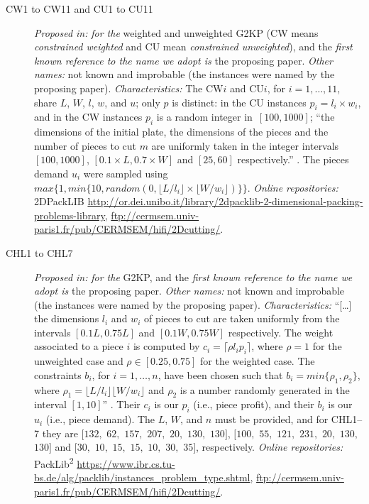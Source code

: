 \documentclass[ppgc,tese,english,formais,babel]{iiufrgs}
\begin{document}
\begin{description}
\item [CW1 to CW11 and CU1 to CU11] \emph{Proposed in:} \citet{fayard:1998} \emph{for the} weighted and unweighted G2KP (CW means \emph{constrained weighted} and CU mean \emph{constrained unweighted}), and the \emph{first known reference to the name we adopt is} the proposing paper. \emph{Other names:} not known and improbable (the instances were named by the proposing paper). \emph{Characteristics: } The CW\(i\) and CU\(i\), for \(i = 1, \dots, 11\), share \(L\), \(W\), \(l\), \(w\), and \(u\); only \(p\) is distinct: in the CU instances \(p_i = l_i \times w_i\), and in the CW instances \(p_i\) is a random integer in~\([100, 1000]\); ``the dimensions of the initial plate, the dimensions of the pieces and the number of pieces to cut \(m\) are uniformly taken in the integer intervals \([100, 1000]\), \([0.1 \times L, 0.7 \times W]\) and \([25, 60]\) respectively.'' \citep{fayard:1998}. The pieces demand \(u_i\) were sampled using~\(max\{1, min\{10, random(0, \lfloor L/l_i \rfloor \times \lfloor W/w_i \rfloor)\}\}\). \emph{Online repositories:} 2DPackLIB \url{http://or.dei.unibo.it/library/2dpacklib-2-dimensional-packing-problems-library}, \url{ftp://cermsem.univ-paris1.fr/pub/CERMSEM/hifi/2Dcutting/}.
\item [CHL1 to CHL7] \emph{Proposed in:} \citet{cung:2000} \emph{for the} G2KP, and the \emph{first known reference to the name we adopt is} the proposing paper. \emph{Other names: } not known and improbable (the instances were named by the proposing paper). \emph{Characteristics: } ``[\dots] the dimensions \(l_i\) and \(w_i\) of pieces to cut are taken uniformly from the intervals \([0.1L, 0.75L]\) and \([0.1W, 0.75W]\) respectively. The weight associated to a piece \(i\) is computed by \(c_i = \lceil\rho l_i p_i\rceil\), where \(\rho = 1\) for the unweighted case and \(\rho \in [0.25, 0.75]\) for the weighted case. The constraints \(b_i\), for \(i = 1, \dots, n\), have been chosen such that \(b_i = min\{\rho_1, \rho_2\}\), where \(\rho_1 = \lfloor L/l_i \rfloor\lfloor W/w_i \rfloor \) and \(\rho_2\) is a number randomly generated in the interval \([1, 10]\)'' \citep{cung:2000}. Their \(c_i\) is our \(p_i\) (i.e., piece profit), and their \(b_i\) is our \(u_i\) (i.e., piece demand). The \(L\), \(W\), and \(n\) must be provided, and for CHL1--7 they are \([132,\) \(62,\) \(157,\) \(207,\) \(20,\) \(130,\) \(130]\), \([100,\) \(55,\) \(121,\) \(231,\) \(20,\) \(130,\) \(130]\) and \([30,\) \(10,\) \(15,\) \(15,\) \(10,\) \(30,\) \(35]\), respectively. \emph{Online repositories:} PackLib\textsuperscript{2} \url{https://www.ibr.cs.tu-bs.de/alg/packlib/instances_problem_type.shtml}, \url{ftp://cermsem.univ-paris1.fr/pub/CERMSEM/hifi/2Dcutting/}.

\end{description}
\end{document}
